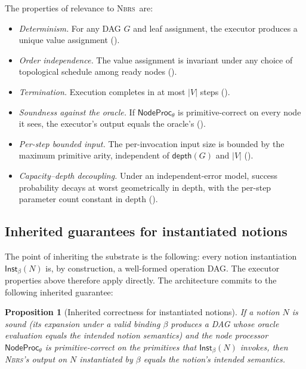 \documentclass[11pt,a4paper]{article}
\theoremstyle{plain}
\newtheorem{proposition}[theorem]{Proposition}
\theoremstyle{definition}
\theoremstyle{remark}
\newcommand{\dep}{\mathsf{depth}}
\newcommand{\NBRS}{\textsc{Nbrs}}
\newcommand{\NodeProc}{\mathsf{NodeProc}}
\newcommand{\Inst}{\mathsf{Inst}}
\begin{document}
The properties of relevance to \NBRS\ are:

\begin{itemize}[topsep=2pt,itemsep=2pt]
  \item \emph{Determinism.} For any DAG $G$ and leaf assignment, the executor produces a unique value assignment ().
  \item \emph{Order independence.} The value assignment is invariant under any choice of topological schedule among ready nodes ().
  \item \emph{Termination.} Execution completes in at most $|V|$ steps ().
  \item \emph{Soundness against the oracle.} If $\NodeProc_\theta$ is primitive-correct on every node it sees, the executor's output equals the oracle's ().
  \item \emph{Per-step bounded input.} The per-invocation input size is bounded by the maximum primitive arity, independent of $\dep(G)$ and $|V|$ ().
  \item \emph{Capacity--depth decoupling.} Under an independent-error model, success probability decays at worst geometrically in depth, with the per-step parameter count constant in depth ().
\end{itemize}

\subsection{Inherited guarantees for instantiated notions}

The point of inheriting the substrate is the following: every notion instantiation $\Inst_\beta(N)$ is, by construction, a well-formed operation DAG. The executor properties above therefore apply directly. The architecture commits to the following inherited guarantee:

\begin{proposition}[Inherited correctness for instantiated notions]
\label{prop:inherited}
If a notion $N$ is sound (its expansion under a valid binding $\beta$ produces a DAG whose oracle evaluation equals the intended notion semantics) and the node processor $\NodeProc_\theta$ is primitive-correct on the primitives that $\Inst_\beta(N)$ invokes, then \NBRS's output on $N$ instantiated by $\beta$ equals the notion's intended semantics.
\end{proposition}
\end{document}
